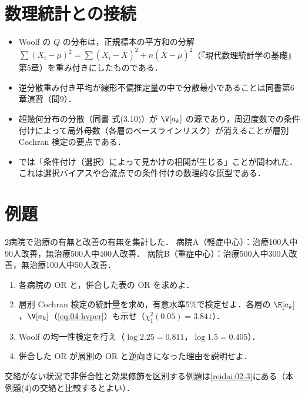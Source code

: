 \section{数理統計との接続}\label{sec:07-link}
\begin{linkbox}
\begin{itemize}
\item Woolf の $Q$ の分布は，正規標本の平方和の分解 $\sum(X_i-\mu)^2=\sum(X_i-\bar X)^2+n(\bar X-\mu)^2$（『現代数理統計学の基礎』第5章）を重み付きにしたものである．
\item 逆分散重み付き平均が線形不偏推定量の中で分散最小であることは同書第6章演習（問9）．
\item 超幾何分布の分散（同書 式(3.10)）が $\V[a_k]$ の源であり，周辺度数での条件付けによって局外母数（各層のベースラインリスク）が消えることが層別 Cochran 検定の要点である．
\item {} では「条件付け（選択）によって見かけの相関が生じる」ことが問われた．これは選択バイアスや合流点での条件付けの数理的な原型である．
\end{itemize}
\end{linkbox}

\section{例題}\label{sec:07-ex}
\begin{reidai}\label{reidai:07-1}
2病院で治療の有無と改善の有無を集計した．
病院A（軽症中心）：治療100人中90人改善，無治療500人中400人改善．
病院B（重症中心）：治療500人中300人改善，無治療100人中50人改善．
\begin{enumerate}[label=(\arabic*)]
\item 各病院の OR と，併合した表の OR を求めよ．
\item 層別 Cochran 検定の統計量を求め，有意水準5\%で検定せよ．各層の $\E[a_k]$，$\V[a_k]$（\cref{eq:04-hyper}）も示せ（$\chi^2_1(0.05)=3.841$）．
\item Woolf の均一性検定を行え（$\log2.25=0.811$，$\log1.5=0.405$）．
\item 併合した OR が層別の OR と逆向きになった理由を説明せよ．
\end{enumerate}
\end{reidai}
交絡がない状況で非併合性と効果修飾を区別する例題は\cref{reidai:02-3}にある（本例題(4)の交絡と比較するとよい）．

